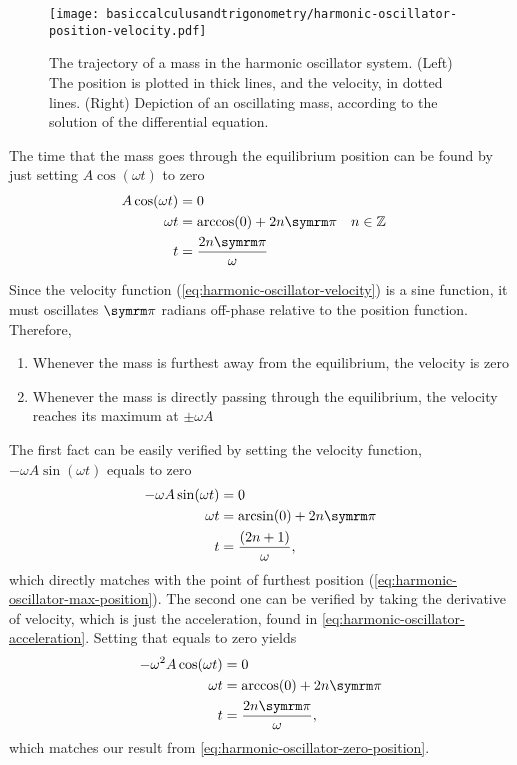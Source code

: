 \begin{figure}[ht]
	\centering
	\texttt{[image: basiccalculusandtrigonometry/harmonic-oscillator-position-velocity.pdf]}
	\caption{The trajectory of a mass in the harmonic oscillator system. (Left) The position is plotted in thick lines, and the velocity, in dotted lines. (Right) Depiction of an oscillating mass, according to the solution of the differential equation.}
	\label{fig:harmonic-oscillator-position-velocity}
\end{figure}

The time that the mass goes through the equilibrium position can be found by just setting $A\cos(\omega t)$ to zero
\begin{align}
	A\cos(\omega t) &= 0 \\
	\omega t &= \arccos(0) + 2n\cpi && n \in \mathbb{Z}\\
	t &= \frac{2n\cpi}{\omega} \label{eq:harmonic-oscillator-zero-position}
\end{align}

Since the velocity function (\cref{eq:harmonic-oscillator-velocity}) is a sine function, it must oscillates $\cpi$ radians off-phase relative to the position function. Therefore, 
\begin{enumerate}
	\item Whenever the mass is furthest away from the equilibrium, the velocity is zero
	\item Whenever the mass is directly passing through the equilibrium, the velocity reaches its maximum at $\pm\omega A$
\end{enumerate}
The first fact can be easily verified by setting the velocity function, $-\omega A\sin(\omega t)$ equals to zero
\begin{align}
	-\omega A\sin(\omega t) &= 0 \\
	\omega t &= \arcsin(0) + 2n\cpi \\
	t &= \frac{(2n + 1)}{\omega},
\end{align}
which directly matches with the point of furthest position (\cref{eq:harmonic-oscillator-max-position}). The second one can be verified by taking the derivative of velocity, which is just the acceleration, found in \cref{eq:harmonic-oscillator-acceleration}. Setting that equals to zero yields
\begin{align}
	-\omega^2A\cos(\omega t) &= 0 \\
	\omega t &= \arccos(0) + 2n\cpi \\
	t &= \frac{2n\cpi}{\omega},
\end{align}
which matches our result from \cref{eq:harmonic-oscillator-zero-position}.

